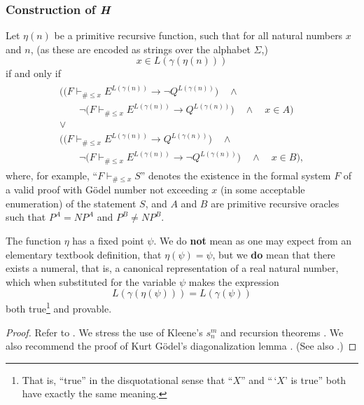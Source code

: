 \documentclass[letterpaper]{article}
\begin{document}
\subsubsection{Construction of \textit{H}}
\begin{construction}
Let $\eta(n)$ be a primitive recursive function, such that for all natural numbers $x$ and $n$, (as these are encoded as strings over the alphabet $\Sigma$,)
\begin{equation}
x\in L(\gamma(\eta(n)))\label{oeta0}
\end{equation}
if and only if
\begin{align}
\begin{gathered}\label{oeta1}
\Big(\big(F\vdash_{\#\le x}E^{L(\gamma(n))}\longrightarrow \lnot Q^{L(\gamma(n))}\big)
 \quad\land \qquad\qquad\\\qquad \lnot\big(F\vdash_{\#\le x}E^{L(\gamma(n))}\longrightarrow Q^{L(\gamma(n))}\big)
\quad\land\quad x\in A\Big) \\
 \lor\\
\Big(\big(F\vdash_{\#\le x}E^{L(\gamma(n))}\longrightarrow Q^{L(\gamma(n))}\big)
 \quad\land \qquad\qquad\\\qquad \lnot\big(F\vdash_{\#\le x}E^{L(\gamma(n))}\longrightarrow \lnot Q^{L(\gamma(n))}\big)
\quad\land\quad x\in B\Big),
\end{gathered}
\end{align}
where, for example, ``$F\vdash_{\#\le x}S$'' denotes the existence in the formal system $F$ of a valid proof with G\"odel number not exceeding $x$ (in some acceptable enumeration) of the statement $S$, and $A$ and $B$ are primitive recursive oracles such that $P^A=NP^A$ and $P^B\ne NP^B$.
\end{construction}
\begin{theorem}\label{etafix}
The function $\eta$ has a fixed point $\psi$.  We do \textbf{not} mean as one may expect from an elementary textbook definition, that $\eta(\psi)=\psi$, but we \textbf{do} mean that there exists a numeral, that is, a canonical representation of a real natural number, which when substituted for the variable $\psi$ makes the expression
\begin{equation}
L(\gamma(\eta(\psi)))=L(\gamma(\psi))\label{ofix}
\end{equation}
both true\footnote{That is, ``true'' in the disquotational sense that ``$X$'' and ``\,`$X$' is true'' both have exactly the same meaning.} and provable.
\end{theorem}
\begin{proof}
	Refer to \cite[\S 2, pp.~5--7]{tr-76-296}.  We stress the use of Kleene's $s^m_n$ and recursion theorems \cite{kleene1936}.  We also recommend the proof of Kurt G\"odel's diagonalization lemma \cite{sep-goedel-incompleteness-sup2}.  (See also \cite{lindstrom2006note}.)
\end{proof}
\end{document}
